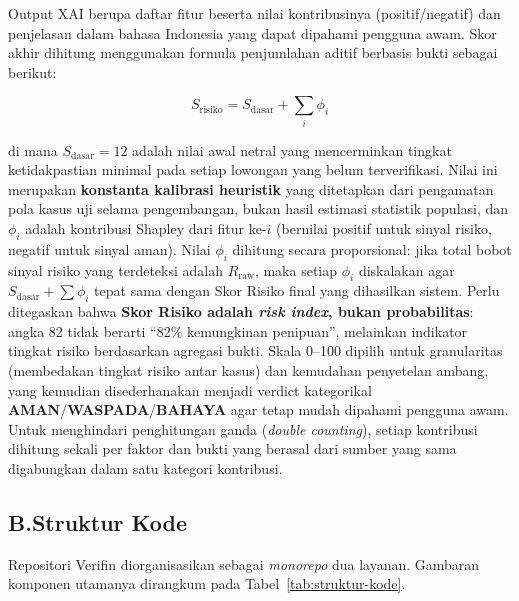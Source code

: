 \documentclass[12pt,a4paper]{article}
\begin{document}
Output XAI berupa daftar fitur beserta nilai kontribusinya (positif/negatif) dan penjelasan
dalam bahasa Indonesia yang dapat dipahami pengguna awam. Skor akhir dihitung menggunakan
formula penjumlahan aditif berbasis bukti sebagai berikut:

\begin{equation}
S_{\text{risiko}} = S_{\text{dasar}} + \sum_{i} \phi_i
\end{equation}

\noindent di mana $S_{\text{dasar}} = 12$ adalah nilai awal netral yang mencerminkan tingkat
ketidakpastian minimal pada setiap lowongan yang belum terverifikasi. Nilai ini merupakan
\textbf{konstanta kalibrasi heuristik} yang ditetapkan dari pengamatan pola kasus uji selama
pengembangan, bukan hasil estimasi statistik populasi, dan $\phi_i$ adalah kontribusi Shapley
dari fitur ke-$i$
(bernilai positif untuk sinyal risiko, negatif untuk sinyal aman). Nilai $\phi_i$ dihitung
secara proporsional: jika total bobot sinyal risiko yang terdeteksi adalah $R_{\text{raw}}$,
maka setiap $\phi_i$ diskalakan agar $S_{\text{dasar}} + \sum \phi_i$ tepat sama dengan
Skor Risiko final yang dihasilkan sistem. Perlu ditegaskan bahwa \textbf{Skor Risiko adalah \textit{risk index}, bukan
probabilitas}: angka 82 tidak berarti ``82\% kemungkinan penipuan'', melainkan indikator tingkat
risiko berdasarkan agregasi bukti. Skala 0--100 dipilih untuk granularitas (membedakan tingkat
risiko antar kasus) dan kemudahan penyetelan ambang, yang kemudian disederhanakan menjadi verdict
kategorikal \textbf{AMAN}/\textbf{WASPADA}/\textbf{BAHAYA} agar tetap mudah dipahami pengguna awam. Untuk menghindari
penghitungan ganda (\textit{double counting}), setiap kontribusi dihitung sekali per faktor dan
bukti yang berasal dari sumber yang sama digabungkan dalam satu kategori kontribusi.

\subsection*{B.\quad Struktur Kode}

Repositori Verifin diorganisasikan sebagai \textit{monorepo} dua layanan. Gambaran komponen utamanya dirangkum pada Tabel~\ref{tab:struktur-kode}.
\end{document}
